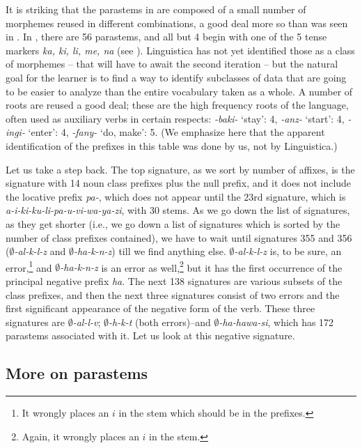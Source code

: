 \documentclass[output=paper,colorlinks,citecolor=brown]{langscibook}
\begin{document}
It is striking that the parastems in  are composed of a small number of morphemes reused in different combinations, a good deal more so than was seen in . In , there are 56 parastems, and all but 4 begin with one of the 5 tense markers \textit{ka, ki, li, me, na} (see ). Linguistica has not yet identified those as a class of morphemes -- that will have to await the second iteration -- but the natural goal for the learner is to find a way to identify subclasses of data that are going to be easier to analyze than the entire vocabulary taken as a whole.  A number of roots are reused a good deal; these are the high frequency roots of the language, often used as auxiliary verbs in certain respects: \textit{-baki-} `stay': 4, \textit{-anz-} `start': 4, \textit{-ingi-} `enter': 4, \textit{-fany-} `do, make': 5. (We emphasize here that the apparent identification of the prefixes in this table was done by us, not by Linguistica.) 


Let us take a step back. The top signature, as we sort by number of affixes, is the signature with 14 noun class prefixes plus the null prefix, and it does not include the locative prefix \textit{pa-}, which does not appear until the 23rd signature, which is \textit{a-i-ki-ku-li-pa-u-vi-wa-ya-zi}, with 30 stems.  As we go down the list of signatures, as they get shorter (i.e., we go down a list of signatures which is sorted by the number of class prefixes contained), we have to wait until signatures 355 and 356 (\textit{$\emptyset$-al-k-l-z} and \textit{$\emptyset$-ha-k-n-z}) till we find anything else. \textit{$\emptyset$-al-k-l-z} is, to be sure, an error,\footnote{It wrongly places an $i$ in the stem which should be in the prefixes.} and \textit{$\emptyset$-ha-k-n-z} is an error as well,\footnote{Again, it wrongly places an $i$ in the stem.} but it has the first occurrence of the principal negative prefix \textit{ha}. The next 138 signatures are various subsets of the class prefixes, and then the next three signatures consist of two errors and the first significant appearance of the negative form of the verb. These three signatures are \textit{$\emptyset$-al-l-v}; \textit{$\emptyset$-h-k-t} (both errors)--and \textit{$\emptyset$-ha-hawa-si}, which has 172 parastems associated with it. Let us look at this negative signature.
 
\subsection{More on parastems}
\end{document}
